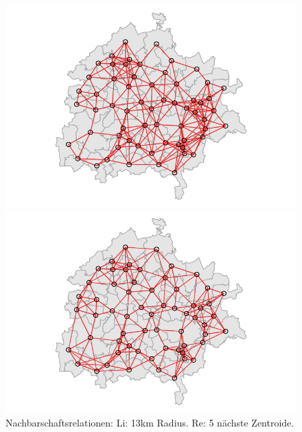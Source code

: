  \begin{figure}[!ht]
        \setlength{\abovedisplayskip}{0pt}
        \setlength{\belowdisplayskip}{0pt}
        \setlength{\abovedisplayshortskip}{0pt}
        \setlength{\belowdisplayshortskip}{0pt}
    \centering %
    \begin{minipage}[b]{.45\linewidth} %
        \includegraphics[scale=0.8,trim={0.5cm 0.2cm 0.5cm 0.2cm},clip]{body/figures/analysis/metropol-13km-neighbours.pdf}%
    \end{minipage} %
    \hfill
    \begin{minipage}[b]{.45\linewidth}
        \includegraphics[scale=0.8,trim={0.5cm 0.2cm 0.5cm 0.2cm},clip]{body/figures/analysis/metropol-5-neighbours.pdf}%
    \end{minipage}
    \caption[Nachbarschaftsrelationen der Metropolregion]{Nachbarschaftsrelationen: Li: 13km Radius. Re: 5 nächste Zentroide. }
    \label{fig_metropol_neighbours}
\end{figure}

